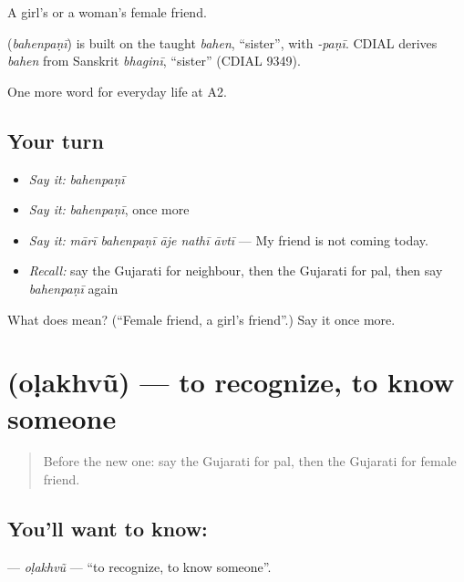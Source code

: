 A girl's or a woman's female friend.

\begin{cousinweb}
\textbf{} (\emph{bahenpaṇī}) is built on the taught \emph{bahen}, \textquotedblleft{}sister\textquotedblright{}, with \emph{-paṇī}. CDIAL derives \emph{bahen} from Sanskrit \emph{bhaginī}, \textquotedblleft{}sister\textquotedblright{} (CDIAL 9349).
\end{cousinweb}

\begin{grammarlens}[title={What you've built}]
One more word for everyday life at A2.
\end{grammarlens}

\subsection*{Your turn}
\begin{itemize}
\raggedright
  \item \emph{Say it:} \emph{bahenpaṇī}
  \item \emph{Say it:} \emph{bahenpaṇī}, once more
  \item \emph{Say it:} \emph{mārī bahenpaṇī āje nathī āvtī} — My friend is not coming today.
  \item \emph{Recall:} say the Gujarati for neighbour, then the Gujarati for pal, then say \emph{bahenpaṇī} again
\end{itemize}

\begin{tcolorbox}[breakable,colback=teal!4,colframe=teal!35!black,title={Before you move on}]
What does  mean? (\textquotedblleft{}Female friend, a girl's friend\textquotedblright{}.) Say it once more.
\end{tcolorbox}
\section[\texorpdfstring{\gu{ઓળખવું} (oḷakhvũ)}{ઓળખવું (oḷakhvũ)}]{ (oḷakhvũ) — to recognize, to know someone}

\label{lesson:GU-C264-olakhvu}



\begin{quote}
Before the new one: say the Gujarati for pal, then the Gujarati for female friend.
\end{quote}

\subsection*{You'll want to know: }
\textbf{} — \emph{oḷakhvũ} — \textquotedblleft{}to recognize, to know someone\textquotedblright{}.

